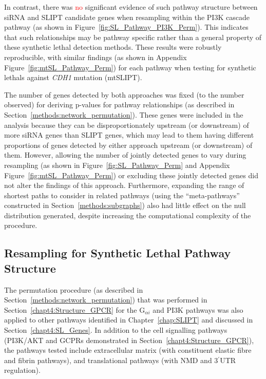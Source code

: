 In contrast, there was \textcolor{red}{no} significant evidence of such \gls{pathway} structure between \gls{siRNA} and \gls{SLIPT} candidate genes when resampling within the PI3K cascade \gls{pathway} (as shown in Figure~\ref{fig:SL_Pathway_PI3K_Perm}). This indicates that such relationships may be \gls{pathway} specific rather than a general property of these \gls{synthetic lethal} detection methods. These results were robustly reproducible, with similar findings (as shown in Appendix Figure~\ref{fig:mtSL_Pathway_Perm}) for each \gls{pathway} when testing for \glspl{synthetic lethal} against \textit{CDH1} \gls{mutation} (\acrshort{mtSLIPT}).

The number of genes detected by both approaches was fixed (to the number observed) for deriving p-values for pathway relationships (as described in Section~\ref{methods:network_permutation}). 
These genes were included in the analysis because they can be disproportionately upstream (or downstream) of more \gls{siRNA} genes than \gls{SLIPT} genes, which may lead to them having different proportions of genes detected by either approach upstream (or downstream) of them. 
However, allowing the number of  jointly detected genes to vary during resampling (as shown in Figure~\ref{fig:SL_Pathway_Perm} and Appendix Figure~\ref{fig:mtSL_Pathway_Perm}) or excluding these jointly detected genes did not alter the findings of this approach. Furthermore, expanding the range of \glspl{shortest path} to consider  in related \glspl{pathway} (using the ``meta-\glspl{pathway}'' constructed in Section~\ref{methods:subgraphs}) also had little effect on the null distribution generated, despite increasing the computational complexity of the procedure.

\FloatBarrier

\subsection{Resampling for Synthetic Lethal Pathway Structure}  \label{chapt4:Structure_Perm}

The permutation procedure (as described in Section~\ref{methods:network_permutation}) that was performed in Section~\ref{chapt4:Structure_GPCR} for the G$_{\alpha i}$ and PI3K \glspl{pathway} was also applied to other \glspl{pathway} identified in Chapter~\ref{chap:SLIPT} and discussed in Section~\ref{chapt4:SL_Genes}. In addition to the cell signalling \glspl{pathway} (PI3K/AKT and GCPRs demonstrated in Section~\ref{chapt4:Structure_GPCR}), the \glspl{pathway} tested include extracellular matrix (with constituent elastic fibre and fibrin \glspl{pathway}), and translational \glspl{pathway} (with \gls{NMD} and 3$^\prime $\gls{UTR} regulation).

